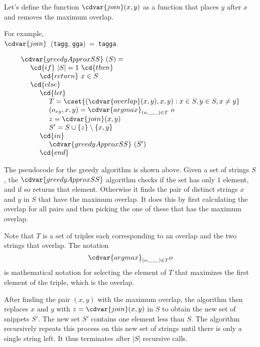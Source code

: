 \begin{cluster}
\label{grp:grm:genome::computing-joins}

\begin{gram}
\label{grm:genome::computing-joins}
Let's define the function $\cdvar{join}(x, y)$ as a function that
places $y$ after $x$ and removes the maximum overlap.

For example, 
\\
$\cdvar{join}$~(\texttt{tagg}, \texttt{gga})~=~\texttt{tagga}.

\end{gram}
\end{cluster}

\begin{cluster}
\label{grp:alg:genome::alg::greedySS}

\begin{algorithm}
\label{alg:genome::alg::greedySS}
\[
\begin{array}{l}
\cdvar{greedyApproxSS}~(S) = 
\\
~~~~\cd{if}~|S| = 1~\cd{then}
\\ 
~~~~~~~~\cd{return}~x \in S
\\
~~~~\cd{else}
\\
~~~~~~~~\cd{let}
\\
~~~~~~~~~~~~T = \cset{(\cdvar{overlap}(x, y), x, y) : x \in S, y \in S, x \neq
  y}
\\
~~~~~~~~~~~~(o_{xy}, x, y) = \cdvar{argmax}_{(o, \_, \_) \in T} ~o
\\
~~~~~~~~~~~~z = \cdvar{join} (x, y)
\\
~~~~~~~~~~~~S' = S \cup \{z\} \setminus \{x,y\}
\\
~~~~~~~~\cd{in}
\\
~~~~~~~~~~~~\cdvar{greedyApproxSS}~(S')
\\
~~~~~~~~\cd{end}
\end{array}
\] 


The pseudocode for the greedy algorithm is shown above.
Given a set of strings $S$, the $\cdvar{greedyApproxSS}$ algorithm
checks if the set has only $1$ element, and if so returns that element.
Otherwise it finds the pair of distinct strings $x$ and $y$ in $S$
that have the maximum overlap.  It does this by first calculating the
overlap for all pairs and then picking the one of these that has the
maximum overlap.

Note that $T$ is a set of triples each corresponding to an overlap and
the two strings that overlap.  The notation 
\[
\cdvar{argmax}_{(o, \_, \_) \in T} o
\]
is mathematical notation for selecting the element of $T$ that
maximizes the first element of the triple, which is the overlap.

After finding the pair $(x,y)$ with the maximum overlap, the
algorithm then replaces $x$ and $y$ with $z = \cdvar{join}(x,y)$
in $S$ to obtain the new set of snippets $S'$.
The new set $S'$ contains one element less than $S$.
The algorithm recursively repeats this process on this new set of
strings until there is only a single string left.  It thus terminates
after $|S|$ recursive calls.

\end{algorithm}
\end{cluster}

